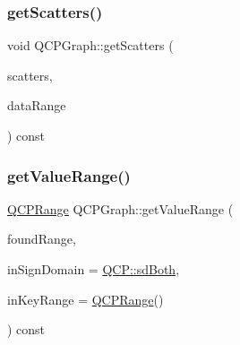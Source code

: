 \mbox{\label{class_q_c_p_graph_a9d7ba5904fdcaca413222335d4b283c3}} 
\subsubsection{\texorpdfstring{getScatters()}{getScatters()}}
{\footnotesize\ttfamily void Q\+C\+P\+Graph\+::get\+Scatters (\begin{DoxyParamCaption}\item[{Q\+Vector$<$ Q\+PointF $>$ $\ast$}]{scatters,  }\item[{const \mbox{\hyperlink{class_q_c_p_data_range}{Q\+C\+P\+Data\+Range}} \&}]{data\+Range }\end{DoxyParamCaption}) const\hspace{0.3cm}{\ttfamily [protected]}}

\mbox{\label{class_q_c_p_graph_a8f773e56f191a61c06e129e90a604d77}} 
\subsubsection{\texorpdfstring{getValueRange()}{getValueRange()}}
{\footnotesize\ttfamily \mbox{\hyperlink{class_q_c_p_range}{Q\+C\+P\+Range}} Q\+C\+P\+Graph\+::get\+Value\+Range (\begin{DoxyParamCaption}\item[{bool \&}]{found\+Range,  }\item[{\mbox{\hyperlink{namespace_q_c_p_afd50e7cf431af385614987d8553ff8a9}{Q\+C\+P\+::\+Sign\+Domain}}}]{in\+Sign\+Domain = {\ttfamily \mbox{\hyperlink{namespace_q_c_p_afd50e7cf431af385614987d8553ff8a9aa38352ef02d51ddfa4399d9551566e24}{Q\+C\+P\+::sd\+Both}}},  }\item[{const \mbox{\hyperlink{class_q_c_p_range}{Q\+C\+P\+Range}} \&}]{in\+Key\+Range = {\ttfamily \mbox{\hyperlink{class_q_c_p_range}{Q\+C\+P\+Range}}()} }\end{DoxyParamCaption}) const\hspace{0.3cm}{\ttfamily [virtual]}}

